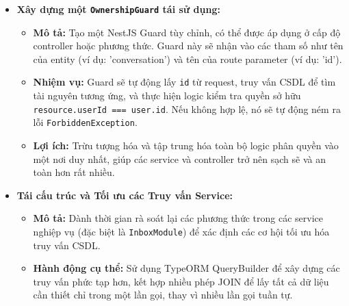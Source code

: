 \begin{itemize}
    \item \textbf{Xây dựng một \texttt{OwnershipGuard} tái sử dụng:}
    \begin{itemize}
        \item \textbf{Mô tả:} Tạo một NestJS Guard tùy chỉnh, có thể được áp dụng ở cấp độ controller hoặc phương thức. Guard này sẽ nhận vào các tham số như tên của entity (ví dụ: 'conversation') và tên của route parameter (ví dụ: 'id').
        \item \textbf{Nhiệm vụ:} Guard sẽ tự động lấy \texttt{id} từ request, truy vấn CSDL để tìm tài nguyên tương ứng, và thực hiện logic kiểm tra quyền sở hữu \texttt{resource.userId === user.id}. Nếu không hợp lệ, nó sẽ tự động ném ra lỗi \texttt{ForbiddenException}.
        \item \textbf{Lợi ích:} Trừu tượng hóa và tập trung hóa toàn bộ logic phân quyền vào một nơi duy nhất, giúp các service và controller trở nên sạch sẽ và an toàn hơn rất nhiều.
    \end{itemize}
    
    \item \textbf{Tái cấu trúc và Tối ưu các Truy vấn Service:}
    \begin{itemize}
        \item \textbf{Mô tả:} Dành thời gian rà soát lại các phương thức trong các service nghiệp vụ (đặc biệt là \texttt{InboxModule}) để xác định các cơ hội tối ưu hóa truy vấn CSDL.
        \item \textbf{Hành động cụ thể:} Sử dụng TypeORM QueryBuilder để xây dựng các truy vấn phức tạp hơn, kết hợp nhiều phép JOIN để lấy tất cả dữ liệu cần thiết chỉ trong một lần gọi, thay vì nhiều lần gọi tuần tự.
    \end{itemize}
\end{itemize}